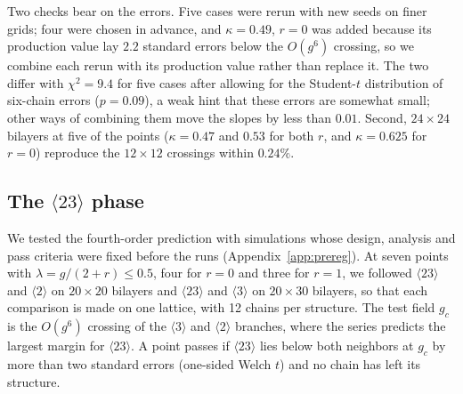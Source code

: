 \documentclass[
 aps,prb,
 twocolumn,
 superscriptaddress,
 longbibliography,
 nofootinbib,
 floatfix
]{revtex4-2}
\begin{document}
Two checks bear on the errors. Five cases were rerun with new seeds on finer grids; four were chosen in advance, and
$\kappa=0.49$, $r=0$ was added because its production value lay $2.2$ standard errors below the $O(g^6)$ crossing, so we
combine each rerun with its production value rather than replace it. The two differ with $\chi^2=9.4$ for five cases
after allowing for the Student-$t$ distribution of six-chain errors ($p=0.09$), a weak hint that these errors are
somewhat small; other ways of combining them move the slopes by less than $0.01$. Second, $24\times24$ bilayers at five
of the points ($\kappa=0.47$ and $0.53$ for both $r$, and $\kappa=0.625$ for $r=0$) reproduce the $12\times12$ crossings
within $0.24\%$.

\subsection{The $\langle23\rangle$ phase}
\label{sec:res_23}

We tested the fourth-order prediction with simulations whose design, analysis and pass criteria were fixed
before the runs (Appendix~\ref{app:prereg}). At seven points with $\lambda=g/(2+r)\le0.5$, four for $r=0$ and three
for $r=1$, we followed $\langle23\rangle$ and $\langle2\rangle$ on $20\times20$ bilayers and $\langle23\rangle$ and
$\langle3\rangle$ on $20\times30$ bilayers, so that each comparison is made on one lattice, with 12 chains per
structure. The test field $g_c$ is the $O(g^6)$ crossing of the $\langle3\rangle$ and $\langle2\rangle$ branches, where
the series predicts the largest margin for $\langle23\rangle$. A point passes if $\langle23\rangle$ lies below both
neighbors at $g_c$ by more than two standard errors (one-sided Welch $t$) and no chain has left its structure.
\end{document}
